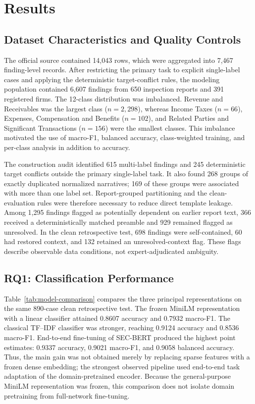 \documentclass[11pt]{article}
\begin{document}
\section{Results}
\label{sec:results}

\subsection{Dataset Characteristics and Quality Controls}

The official source contained 14,043 rows, which were aggregated into 7,467
finding-level records. After restricting the primary task to explicit single-label
cases and applying the deterministic target-conflict rules, the modeling population
contained 6,607 findings from 650 inspection reports and 391 registered firms.
The 12-class distribution was imbalanced. Revenue and Receivables was the largest
class ($n=2{,}298$), whereas Income Taxes ($n=66$), Expenses, Compensation and
Benefits ($n=102$), and Related Parties and Significant Transactions ($n=156$)
were the smallest classes. This imbalance motivated the use of macro-F1, balanced
accuracy, class-weighted training, and per-class analysis in addition to accuracy.

The construction audit identified 615 multi-label findings and 245 deterministic
target conflicts outside the primary single-label task. It also found 268 groups
of exactly duplicated normalized narratives; 169 of these groups were associated
with more than one label set. Report-grouped partitioning and the clean-evaluation
rules were therefore necessary to reduce direct template leakage. Among 1,295
findings flagged as potentially dependent on earlier report text, 366 received a
deterministically matched preamble and 929 remained flagged as unresolved. In the
clean retrospective test, 698 findings were self-contained, 60 had restored
context, and 132 retained an unresolved-context flag. These flags describe
observable data conditions, not expert-adjudicated ambiguity.

\subsection{RQ1: Classification Performance}

Table~\ref{tab:model-comparison} compares the three principal representations on
the same 890-case clean retrospective test. The frozen MiniLM representation with
a linear classifier attained 0.8607 accuracy and 0.7932 macro-F1. The classical
TF--IDF classifier was stronger, reaching 0.9124 accuracy and 0.8536 macro-F1.
End-to-end fine-tuning of SEC-BERT produced the highest point estimates: 0.9337
accuracy, 0.9021 macro-F1, and 0.9058 balanced accuracy. Thus, the main gain was
not obtained merely by replacing sparse features with a frozen dense embedding;
the strongest observed pipeline used end-to-end task adaptation of the
domain-pretrained encoder. Because the general-purpose MiniLM representation was
frozen, this comparison does not isolate domain pretraining from full-network
fine-tuning.
\end{document}
